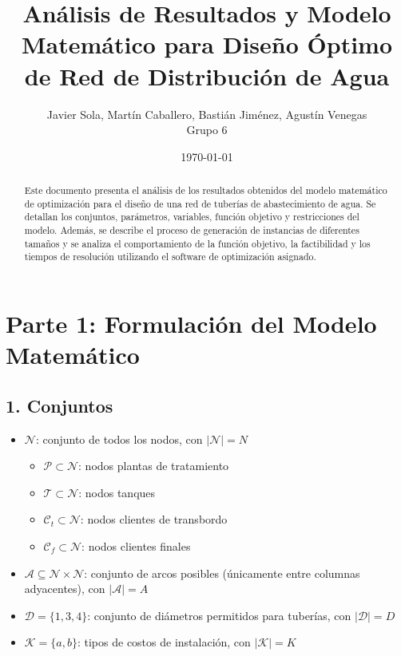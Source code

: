 \documentclass[12pt]{article}
\title{Análisis de Resultados y Modelo Matemático para Diseño Óptimo de Red de Distribución de Agua}
\author{Javier Sola, Martín Caballero, Bastián Jiménez, Agustín Venegas \\ \small Grupo 6}
\date{\today}
\begin{document}
\maketitle

\begin{abstract}
Este documento presenta el análisis de los resultados obtenidos del modelo matemático de optimización para el diseño de una red de tuberías de abastecimiento de agua. Se detallan los conjuntos, parámetros, variables, función objetivo y restricciones del modelo. Además, se describe el proceso de generación de instancias de diferentes tamaños y se analiza el comportamiento de la función objetivo, la factibilidad y los tiempos de resolución utilizando el software de optimización asignado.
\end{abstract}

\clearpage
\tableofcontents
\clearpage

\section{Parte 1: Formulación del Modelo Matemático}

\subsection*{1. Conjuntos}

\begin{itemize}
  \item \( \mathcal{N} \): conjunto de todos los nodos, con \(|\mathcal{N}| = N\)
  \begin{itemize}
    \item \( \mathcal{P} \subset \mathcal{N} \): nodos plantas de tratamiento
    \item \( \mathcal{T} \subset \mathcal{N} \): nodos tanques
    \item \( \mathcal{C}_t \subset \mathcal{N} \): nodos clientes de transbordo
    \item \( \mathcal{C}_f \subset \mathcal{N} \): nodos clientes finales
  \end{itemize}
  \item \( \mathcal{A} \subseteq \mathcal{N} \times \mathcal{N} \): conjunto de arcos posibles (únicamente entre columnas adyacentes), con \(|\mathcal{A}| = A\)
  \item \( \mathcal{D} = \{1,3,4\} \): conjunto de diámetros permitidos para tuberías, con \(|\mathcal{D}| = D\)
  \item \( \mathcal{K} = \{a,b\} \): tipos de costos de instalación, con \(|\mathcal{K}| = K\)
\end{itemize}
\end{document}
